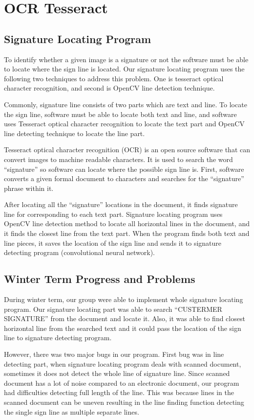 \documentclass[onecolumn, draftclsnofoot,10pt, compsoc]{IEEEtran}
\begin{document}
\section{OCR Tesseract}
\subsection{Signature Locating Program}
To identify whether a given image is a signature or not the software must be able to locate where the sign line is located. Our signature locating program uses the following two techniques to address this problem. One is tesseract optical character recognition, and second is OpenCV line detection technique.

Commonly, signature line consists of two parts which are text and line. To locate the sign line, software must be able to locate both text and line, and software uses Tesseract optical character recognition to locate the text part and OpenCV line detecting technique to locate the line part. 

Tesseract optical character recognition (OCR) is an open source software that can convert images to machine readable characters. It is used to search the word “signature” so software can locate where the possible sign line is. First, software converts a given formal document to characters and searches for the “signature” phrase within it.

After locating all the “signature” locations in the document, it finds signature line for corresponding to each text part. Signature locating program uses OpenCV line detection method to locate all horizontal lines in the document, and it finds the closest line from the text part. When the program finds both text and line pieces, it saves the location of the sign line and sends it to signature detecting program (convolutional neural network).

\subsection{Winter Term Progress and Problems}
During winter term, our group were able to implement whole signature locating program. Our signature locating part was able to search “CUSTERMER SIGNATURE” from the document and locate it. Also, it was able to find closest horizontal line from the searched text and it could pass the location of the sign line to signature detecting program.

However, there was two major bugs in our program. First bug was in line detecting part, when signature locating program deals with scanned document, sometimes it does not detect the whole line of signature line. Since scanned document has a lot of noise compared to an electronic document, our program had difficulties detecting full length of the line.  This was because lines in the scanned document can be uneven resulting in the line finding function detecting the single sign line as multiple separate lines. 
\end{document}
